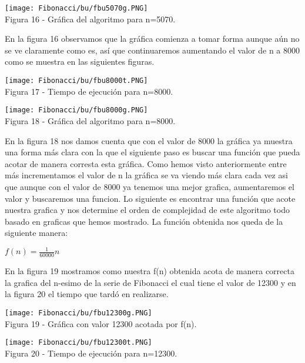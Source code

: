 \documentclass[12pt,twoside]{article}
\begin{document}
\begin{center}
    \texttt{[image: Fibonacci/bu/fbu5070g.PNG]}\\
    Figura 16 - Gráfica del algoritmo para n=5070.
\end{center}
\newline
En la figura 16 observamos que la gráfica comienza a tomar forma aunque aún no se ve claramente como es, así que continuaremos aumentando el valor de n a 8000 como se muestra en las siguientes figuras.
\begin{center}
    \texttt{[image: Fibonacci/bu/fbu8000t.PNG]}\\
    Figura 17 - Tiempo de ejecución para n=8000.
\end{center}

\begin{center}
    \texttt{[image: Fibonacci/bu/fbu8000g.PNG]}\\
    Figura 18 - Gráfica del algoritmo para n=8000.
\end{center}
\newline
En la figura 18 nos damos cuenta que con el valor de 8000 la gráfica ya muestra una forma más clara con la que el siguiente paso es buscar una función que pueda acotar de manera corresta esta gráfica. \newline
Como hemos visto anteriormente entre más incrementamos el valor de n la gráfica se va viendo más clara cada vez asi que aunque con el valor de 8000 ya tenemos una mejor grafica, aumentaremos el valor y buscaremos una funcion. \newline \newline
Lo siguiente es encontrar una funci\'on que acote nuestra grafica y nos determine el orden de complejidad de este algoritmo todo basado en graficas que hemos mostrado. La funci\'on obtenida nos queda de la siguiente manera:
\begin{center}
    $f(n) = \frac{1}{60000}n$
\end{center}
En la figura 19 mostramos como nuestra f(n) obtenida acota de manera correcta la grafica del n-esimo de la serie de Fibonacci el cual tiene el valor de 12300 y en la figura 20 el tiempo que tard\'o en realizarse.
\begin{center}
    \texttt{[image: Fibonacci/bu/fbu12300g.PNG]}\\
    Figura 19 - Gráfica con valor 12300 acotada por f(n).
\end{center}
\begin{center}
    \texttt{[image: Fibonacci/bu/fbu12300t.PNG]}\\
    Figura 20 - Tiempo de ejecución para n=12300.
\end{center}
\end{document}
